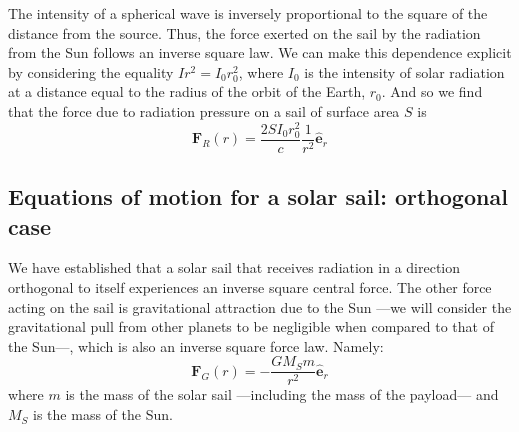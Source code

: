 \documentclass[twocolumn,12pt,a4paper]{article}
\numberwithin{equation}{section}
\begin{document}
The intensity of a spherical wave is inversely proportional to the square of the distance from the source. Thus, the force exerted on the sail by the radiation from the Sun follows an inverse square law. We can make this dependence explicit by considering the equality \( Ir^2 = I_0 r^2_0 \), where \( I_0 \) is the intensity of solar radiation at a distance equal to the radius of the orbit of the Earth, \( r_0 \). And so we find that the force due to radiation pressure on a sail of surface area \( S \) is
\begin{equation}
 	\mathbf{F}_R(r) = \dfrac{2SI_0r_0^2}{c}\dfrac{1}{r^2} \mathbf{\hat{e}}_r \label{eq:radiation force}
\end{equation}

\subsection{Equations of motion for a solar sail: orthogonal case}
We have established that a solar sail that receives radiation in a direction orthogonal to itself experiences an inverse square central force. The other force acting on the sail is gravitational attraction due to the Sun ---we will consider the gravitational pull from other planets to be negligible when compared to that of the Sun---, which is also an inverse square force law. Namely:
\begin{equation}
 	\mathbf{F}_G(r) = -\dfrac{G M_S m}{r^2} \mathbf{\hat{e}}_r \label{eq:gravitational force}
\end{equation}
where \( m \) is the mass of the solar sail ---including the mass of the payload--- and \( M_S \) is the mass of the Sun.
\end{document}

